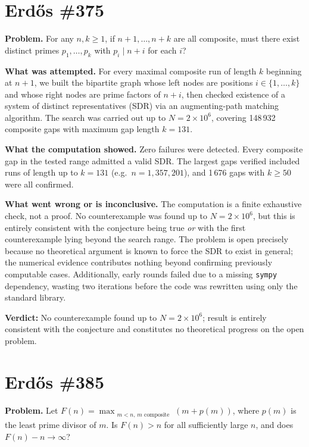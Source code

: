 \documentclass[11pt]{article}
\begin{document}
\clearpage

\section{Erdős \#375}

\textbf{Problem.} For any $n,k\geq 1$, if $n+1,\ldots,n+k$ are all composite, must there exist distinct primes $p_1,\ldots,p_k$ with $p_i\mid n+i$ for each $i$?

\textbf{What was attempted.} For every maximal composite run of length $k$ beginning at $n+1$, we built the bipartite graph whose left nodes are positions $i\in\{1,\ldots,k\}$ and whose right nodes are prime factors of $n+i$, then checked existence of a system of distinct representatives (SDR) via an augmenting-path matching algorithm. The search was carried out up to $N=2\times10^6$, covering 148\,932 composite gaps with maximum gap length $k=131$.

\textbf{What the computation showed.} Zero failures were detected. Every composite gap in the tested range admitted a valid SDR. The largest gaps verified included runs of length up to $k=131$ (e.g.\ $n=1{,}357{,}201$), and 1\,676 gaps with $k\geq 50$ were all confirmed.

\textbf{What went wrong or is inconclusive.} The computation is a finite exhaustive check, not a proof. No counterexample was found up to $N=2\times10^6$, but this is entirely consistent with the conjecture being true \emph{or} with the first counterexample lying beyond the search range. The problem is open precisely because no theoretical argument is known to force the SDR to exist in general; the numerical evidence contributes nothing beyond confirming previously computable cases. Additionally, early rounds failed due to a missing \texttt{sympy} dependency, wasting two iterations before the code was rewritten using only the standard library.

\textbf{Verdict:} No counterexample found up to $N=2\times10^6$; result is entirely consistent with the conjecture and constitutes no theoretical progress on the open problem.

\clearpage

\section{Erd\H{o}s \#385}

\textbf{Problem.} Let $F(n) = \max_{\substack{m < n,\, m \text{ composite}}} (m + p(m))$, where $p(m)$ is the least prime divisor of $m$. Is $F(n) > n$ for all sufficiently large $n$, and does $F(n) - n \to \infty$?
\end{document}
